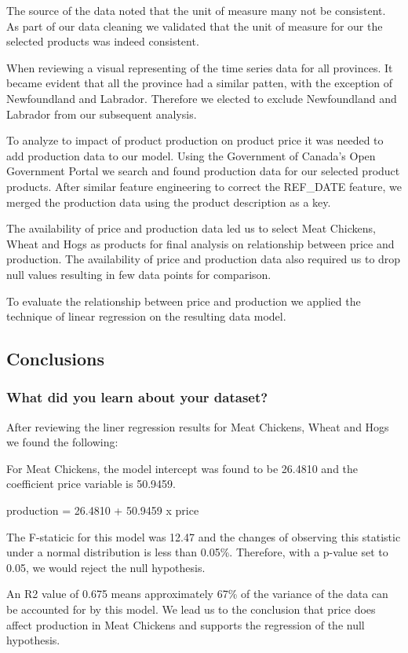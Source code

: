The source of the data noted that the unit of measure many not be consistent. As part of our data cleaning we validated that the unit of measure for our the selected products was indeed consistent. 

When reviewing a visual representing of the time series data for all provinces. It became evident that all the province had a similar patten, with the exception of Newfoundland and Labrador. Therefore we elected to exclude Newfoundland and Labrador from our subsequent analysis.

To analyze to impact of product production on product price it was needed to add production data to our model. Using the Government of Canada's Open Government Portal we search and found production data for our selected product products. After similar feature engineering to correct the REF\_DATE feature, we merged the production data using the product description as a key.

The availability of price and production data led us to select Meat Chickens, Wheat and Hogs as products for final analysis on relationship between price and production. The availability of price and production data also required us to drop null values resulting in few data points for comparison.

To evaluate the relationship between price and production we applied the technique of linear regression on the resulting data model.

\subsection{Conclusions}

\subsubsection{What did you learn about your dataset?}

After reviewing the liner regression results for Meat Chickens, Wheat and Hogs we found the following:

For Meat Chickens, the model intercept was found to be 26.4810 and the coefficient price variable is 50.9459. 

production = 26.4810 + 50.9459 x price

The F-staticic for this model was 12.47 and the changes of observing this statistic under a normal distribution is less than 0.05\%. Therefore, with a p-value set to 0.05, we would reject the null hypothesis. 

An R2 value of  0.675  means approximately 67\% of the variance of the data can be accounted for by this model. We lead us to the conclusion that price does affect production in Meat Chickens and supports the regression of the null hypothesis. 

